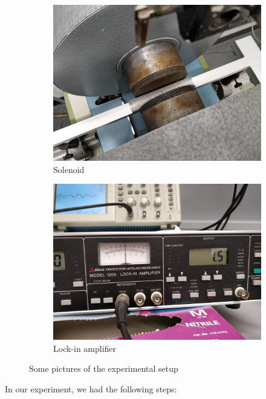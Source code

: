 \documentclass[11pt,a4paper]{article}
\begin{document}
\begin{figure}[H]
\begin{subfigure}[b]{0.45\textwidth}
\includegraphics[width=\textwidth]{solenoid}
\caption{Solenoid}
\label{fig:exp_setup_solenoid}
\end{subfigure}
\begin{subfigure}[b]{0.45\textwidth}
\includegraphics[width=\textwidth]{lock-in}
\caption{Lock-in amplifier}
\label{fig:exp_setup_lockin}
\end{subfigure}
\caption{Some pictures of the experimental setup}\label{fig:exp_setup}
\end{figure}
	
In our experiment, we had the following steps:
\end{document}

